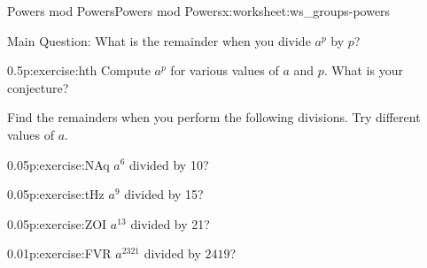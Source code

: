 \documentclass[11pt]{book}
\begin{document}
%
%
\typeout{************************************************}
\typeout{************************************************}
%
\begin{worksheet-subsection}{Powers mod Powers}{}{Powers mod Powers}{}{}{x:worksheet:ws_groups-powers}
\begin{introduction}{}%
Main Question: What is the remainder when you divide \(a^p\) by \(p\)?%
\end{introduction}%
\begin{divisionexercise}{1}{}{0.5}{p:exercise:hth}%
Compute \(a^p\) for various values of \(a\) and \(p\).  What is your conjecture?%
\end{divisionexercise}%
Find the remainders when you perform the following divisions.  Try different values of \(a\).%
\begin{divisionexercise}{2}{}{0.05}{p:exercise:NAq}%
\(a^6\) divided by 10?%
\end{divisionexercise}%
\begin{divisionexercise}{3}{}{0.05}{p:exercise:tHz}%
\(a^9\) divided by 15?%
\end{divisionexercise}%
\begin{divisionexercise}{4}{}{0.05}{p:exercise:ZOI}%
\(a^{13}\) divided by 21?%
\end{divisionexercise}%
\begin{divisionexercise}{5}{}{0.01}{p:exercise:FVR}%
\(a^{2321}\) divided by \(2419\)?%
\end{divisionexercise}%
\end{worksheet-subsection}
\restoregeometry
\end{document}
